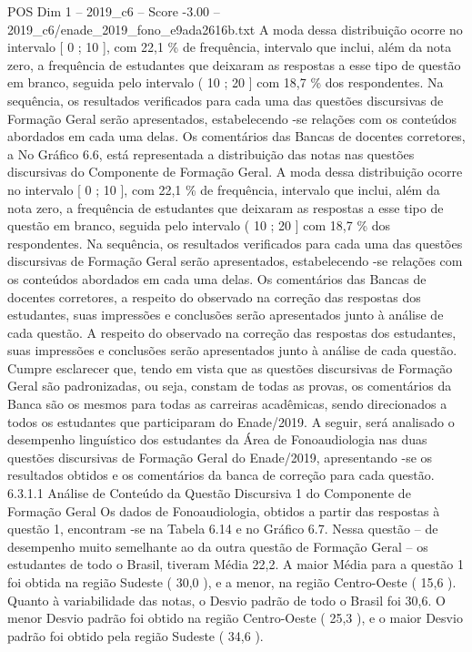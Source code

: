\begin{textsample}{POS Dim 1 – 2019\_c6 – Score -3.00 – 2019\_c6/enade\_2019\_fono\_e9ada2616b.txt}
A moda dessa distribuição ocorre no intervalo [ 0 ; 10 ], com 22,1 \% de frequência, intervalo que inclui, além da nota zero, a frequência de estudantes que deixaram as respostas a esse tipo de questão em branco, seguida pelo intervalo ( 10 ; 20 ] com 18,7 \% dos respondentes.
Na sequência, os resultados verificados para cada uma das questões discursivas de Formação Geral serão apresentados, estabelecendo -se relações com os conteúdos abordados em cada uma delas.
Os comentários das Bancas de docentes corretores, a No Gráfico 6.6, está representada a distribuição das notas nas questões discursivas do Componente de Formação Geral.
A moda dessa distribuição ocorre no intervalo [ 0 ; 10 ], com 22,1 \% de frequência, intervalo que inclui, além da nota zero, a frequência de estudantes que deixaram as respostas a esse tipo de questão em branco, seguida pelo intervalo ( 10 ; 20 ] com 18,7 \% dos respondentes.
Na sequência, os resultados verificados para cada uma das questões discursivas de Formação Geral serão apresentados, estabelecendo -se relações com os conteúdos abordados em cada uma delas.
Os comentários das Bancas de docentes corretores, a respeito do observado na correção das respostas dos estudantes, suas impressões e conclusões serão apresentados junto à análise de cada questão.
A respeito do observado na correção das respostas dos estudantes, suas impressões e conclusões serão apresentados junto à análise de cada questão.
Cumpre esclarecer que, tendo em vista que as questões discursivas de Formação Geral são padronizadas, ou seja, constam de todas as provas, os comentários da Banca são os mesmos para todas as carreiras acadêmicas, sendo direcionados a todos os estudantes que participaram do Enade/2019.
A seguir, será analisado o desempenho linguístico dos estudantes da Área de Fonoaudiologia nas duas questões discursivas de Formação Geral do Enade/2019, apresentando -se os resultados obtidos e os comentários da banca de correção para cada questão. 6.3.1.1 Análise de Conteúdo da Questão Discursiva 1 do Componente de Formação Geral Os dados de Fonoaudiologia, obtidos a partir das respostas à questão 1, encontram -se na Tabela 6.14 e no Gráfico 6.7.
Nessa questão – de desempenho muito semelhante ao da outra questão de Formação Geral – os estudantes de todo o Brasil, tiveram Média 22,2.
A maior Média para a questão 1 foi obtida na região Sudeste ( 30,0 ), e a menor, na região Centro-Oeste ( 15,6 ).
Quanto à variabilidade das notas, o Desvio padrão de todo o Brasil foi 30,6.
O menor Desvio padrão foi obtido na região Centro-Oeste ( 25,3 ), e o maior Desvio padrão foi obtido pela região Sudeste ( 34,6 ).

\end{textsample}

